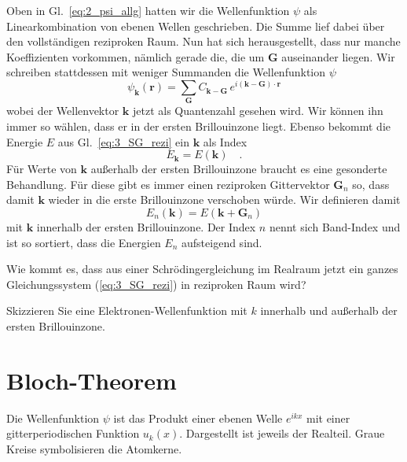 Oben in Gl.~\ref{eq:2_psi_allg} hatten wir die Wellenfunktion $\psi$ als Linearkombination von ebenen Wellen geschrieben. Die Summe lief dabei über den vollständigen  reziproken Raum.
Nun hat sich herausgestellt, dass nur manche Koeffizienten vorkommen, nämlich gerade die, die um $\mathbf{G}$ auseinander liegen.  Wir schreiben stattdessen mit weniger Summanden die Wellenfunktion $\psi$ 
\begin{equation}
    \psi_\mathbf{k}(\mathbf{r}) =  \sum_{\mathbf{G}} C_{\mathbf{k}-\mathbf{G}} \, e^{i (\mathbf{k}- \mathbf{G}) \cdot \mathbf{r} } 
\end{equation}
wobei der Wellenvektor $\mathbf{k}$ jetzt als Quantenzahl gesehen wird. Wir können ihn immer so wählen, dass er in der ersten Brillouinzone liegt. Ebenso bekommt die Energie $E$ aus Gl.~\ref{eq:3_SG_rezi} ein   $\mathbf{k}$ als Index
\begin{equation}
    E_\mathbf{k} = E(\mathbf{k}) \quad .
\end{equation}
Für Werte von  $\mathbf{k}$ außerhalb der ersten Brillouinzone braucht es eine gesonderte Behandlung. Für diese gibt es immer einen  reziproken Gittervektor $\mathbf{G}_n$ so, dass damit $\mathbf{k}$ wieder in die erste Brillouinzone verschoben würde. Wir definieren damit
\begin{equation}
    E_n(\mathbf{k}) = E(\mathbf{k} + \mathbf{G}_n)
\end{equation}
mit $\mathbf{k}$ innerhalb der ersten Brillouinzone.
Der Index  $n$ nennt sich Band-Index und ist so sortiert, dass die Energien $E_n$ aufsteigend sind.

\begin{questions}
    \item Wie kommt es, dass aus einer Schrödingergleichung im Realraum jetzt ein ganzes Gleichungssystem (\ref{eq:3_SG_rezi}) in reziproken Raum wird?
    \item Skizzieren Sie eine Elektronen-Wellenfunktion mit $k$ innerhalb und außerhalb der ersten Brillouinzone.
\end{questions}


\section{Bloch-Theorem}

\begin{marginfigure}
    \caption{Die Wellenfunktion $\psi$ ist das Produkt einer ebenen Welle $e^{i k x}$ mit einer gitterperiodischen Funktion $u_k(x)$. Dargestellt ist jeweils der Realteil. Graue Kreise symbolisieren die Atomkerne. }
\end{marginfigure}


